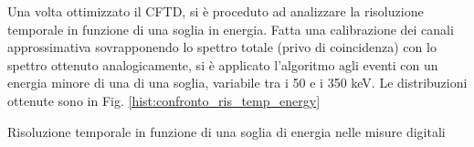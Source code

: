 Una volta ottimizzato il CFTD, si è proceduto ad analizzare la risoluzione temporale in funzione di una soglia in energia. Fatta una calibrazione dei canali approssimativa sovrapponendo lo spettro totale (privo di coincidenza) con lo spettro ottenuto analogicamente, si è applicato l'algoritmo agli eventi con un energia minore di una di una soglia, variabile tra i 50 e i 350 keV. Le distribuzioni ottenute sono in Fig. \ref{hist:confronto_ris_temp_energy}



\begin{table}[h]
	\centering
	
	\caption{Risoluzione temporale in funzione di una soglia di energia nelle misure digitali}
	\label{tab:threshold_fwhm_digi}
\end{table}

